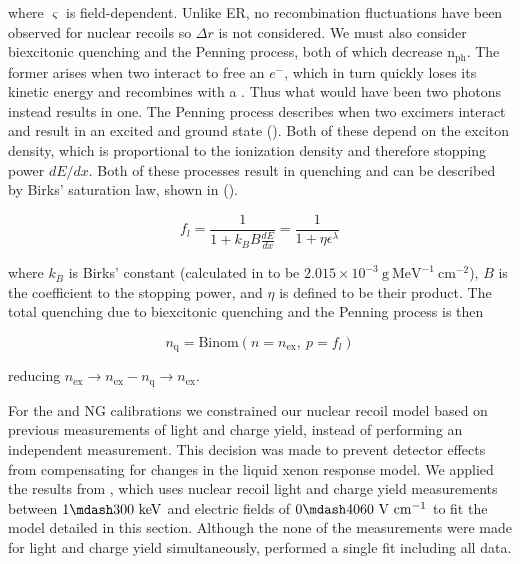 \noindent where $\varsigma$ is field-dependent.  Unlike ER, no recombination fluctuations have been observed for nuclear recoils so
$\Delta r$ is not considered.  We must also consider biexcitonic quenching and the Penning process, both of which decrease
$\mathrm{n_{ph}}$.  The former arises when two
 interact to free an $e^-$, which in turn quickly loses its kinetic energy
and recombines with a .  Thus what would have been two photons instead results in one.  The Penning process describes when
two excimers interact and result in an excited and ground state ().  Both of these depend on the exciton density, which
is proportional to the ionization density and therefore stopping power $dE / dx$.  Both of these processes result in quenching and can be
described by Birks' saturation law, shown in  ().

\begin{equation}
f_l = \frac{1}{1 + k_{B}B \frac{dE}{dx}} = \frac{1}{1 + \eta \epsilon^{\lambda}}
\label{eq:er_nr_calibrations_parameter_determ_nr_birks}
\end{equation}

\noindent where $k_B$ is Birks' constant (calculated in  to be $2.015 \times 10^{-3}\ \mathrm{g\ MeV^{-1}\ cm^{-2}}$),
$B$ is the coefficient to the stopping power, and $\eta$ is defined to be their product.  The total quenching due to biexcitonic quenching
and the Penning process is then

\begin{equation}
n_{\mathrm{q}} = \mathrm{Binom} (n = n_{\mathrm{ex}},\ p = f_l)
\end{equation}

\noindent reducing $n_{\mathrm{ex}} \rightarrow n_{\mathrm{ex}} - n_{\mathrm{q}} \rightarrow n_{\mathrm{ex}}$.

For the \ambe and NG calibrations we constrained our nuclear recoil model based on previous measurements of light and charge yield,
instead of performing an independent measurement.  This decision was made to prevent detector effects from compensating for changes
in the liquid xenon response model.  We applied the results from , which uses nuclear recoil light and charge yield
measurements between $1 \mdash 300\ \mathrm{keV}$ and electric fields of $0 \mdash 4060\ \mathrm{V\ cm^{-1}}$ to fit the model
detailed in this section.  Although the none of the measurements were made for light and charge yield simultaneously, 
performed a single fit including all data.

